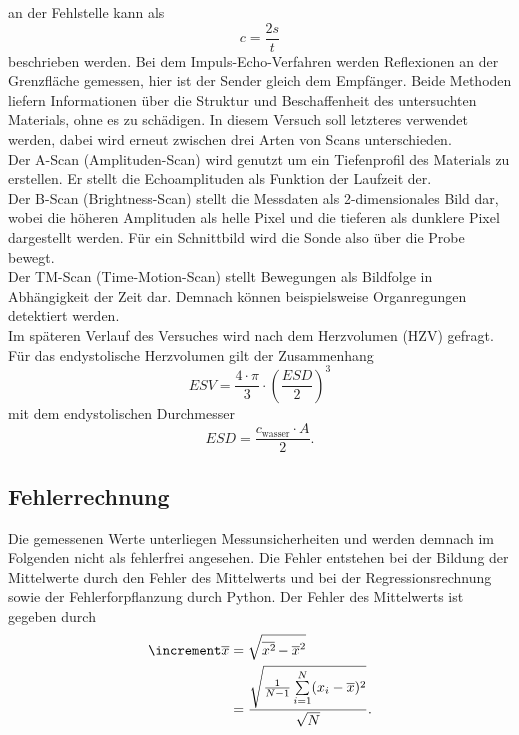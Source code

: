 an der Fehlstelle kann als
\begin{equation}
    \label{eqn:3}
    c = \frac{2s}{t}
\end{equation}
beschrieben werden.
Bei dem Impuls-Echo-Verfahren werden Reflexionen an der Grenzfläche gemessen, hier 
ist der Sender gleich dem Empfänger. Beide Methoden liefern Informationen über
die Struktur und Beschaffenheit des untersuchten Materials, ohne es zu schädigen.
In diesem Versuch soll letzteres verwendet werden, dabei wird erneut zwischen 
drei Arten von Scans unterschieden.
\vspace{0.5em}
\\
\noindent Der A-Scan (Amplituden-Scan) wird genutzt um ein Tiefenprofil des 
Materials zu erstellen. Er stellt die Echoamplituden als Funktion der Laufzeit
der.
\vspace{0.5em}
\\
\noindent Der B-Scan (Brightness-Scan) stellt die Messdaten als 2-dimensionales 
Bild dar, wobei die höheren Amplituden als helle Pixel und die tieferen als 
dunklere Pixel dargestellt werden. Für ein Schnittbild wird die Sonde also 
über die Probe bewegt.
\vspace{0.5em}
\\
\noindent Der TM-Scan (Time-Motion-Scan) stellt Bewegungen als Bildfolge in 
Abhängigkeit der Zeit dar. Demnach können beispielsweise Organregungen 
detektiert werden.
\vspace{0.5em}
\\
\noindent Im späteren Verlauf des Versuches wird nach dem Herzvolumen (HZV) 
gefragt. Für das endystolische Herzvolumen gilt der Zusammenhang
\begin{equation}
    ESV = \frac{4\cdot \pi}{3}\cdot\left(\frac{ESD}{2}\right)^3
\end{equation}
\noindent mit dem endystolischen Durchmesser
\begin{equation}
    ESD = \frac{c_\text{wasser} \cdot A}{2}.
\end{equation}

\subsection{Fehlerrechnung}
Die gemessenen Werte unterliegen Messunsicherheiten und werden demnach im
Folgenden nicht als fehlerfrei angesehen. Die Fehler entstehen bei der
Bildung der Mittelwerte durch den Fehler des Mittelwerts und bei der
Regressionsrechnung sowie der Fehlerforpflanzung durch Python.
Der Fehler des Mittelwerts ist gegeben durch 
\begin{equation}
    \begin{aligned}
        \increment \overline{x} &= \sqrt{\overline{x^2\kern-0.1em} - \overline{x}^2} \\
                            &= \frac{\sqrt{\frac{1}{N-1} \sum\limits_{i=1}^N (x_i - \overline{x})^2}}{\sqrt{N}}.
    \end{aligned}
\end{equation}

